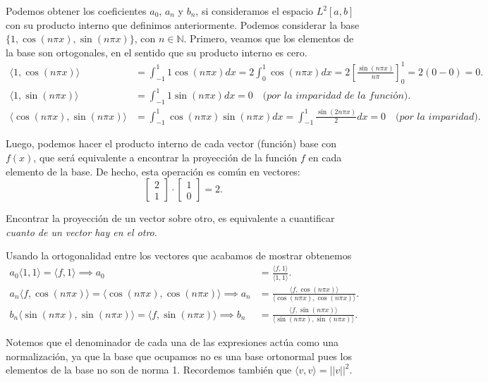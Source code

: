 \documentclass[12pt]{book}
\begin{document}
Podemos obtener los coeficientes $a_0$, $a_n$ y $b_n$, si consideramos el espacio $L^2[a,b]$ con su producto interno que definimos anteriormente. Podemos considerar la base $\{1,\cos(n\pi x), \sin(n\pi x)\}$, con $n\in \mathbb{N}$. Primero, veamos que los elementos de la base son ortogonales, en el sentido que su producto interno es cero.
\begin{align*}
    \langle 1,\cos(n\pi x)\rangle&=\int_{-1}^1 1\cos(n\pi x) dx=2\int_0^1 \cos(n\pi x)dx=2 \left[\frac{\sin(n\pi x)}{n\pi}\right]_0^1 =2(0-0)=0.\\
    \langle 1,\sin(n\pi x)\rangle&=\int_{-1}^1 1\sin(n\pi x) dx=0 \quad\textit{(por la imparidad de la función)}.\\
    \langle \cos(n\pi x),\sin(n\pi x)\rangle&=\int_{-1}^1 \cos(n\pi x)\sin(n\pi x) dx=\int_{-1}^1\frac{\sin(2n\pi x)}{2}dx=0\quad \textit{(por la imparidad)}.
\end{align*}

Luego, podemos hacer el producto interno de cada vector (función) base con $f(x)$, que será equivalente a encontrar la proyección de la función $f$ en cada elemento de la base. De hecho, esta operación es común en vectores:
    $$ \begin{bmatrix} 2 \\ 1 \end{bmatrix}\cdot \begin{bmatrix} 1 \\ 0 \end{bmatrix} = 2.$$

Encontrar la proyección de un vector sobre otro, es equivalente a cuantificar \textit{cuanto de un vector hay en el otro}.


Usando la ortogonalidad entre los vectores que acabamos de mostrar obtenemos
\begin{align*}
    a_0 \langle 1,1\rangle=\langle f, 1\rangle\implies a_0&=\frac{\langle f, 1\rangle}{\langle 1,1\rangle}.\\
    a_n\langle f, \cos(n\pi x)\rangle=\langle \cos(n\pi x), \cos(n\pi x)\rangle\implies a_n&= \frac{\langle f, \cos(n\pi x)\rangle}{\langle\cos(n\pi x),\cos(n\pi x)\rangle}.\\
    b_n\langle\sin(n\pi x),\sin(n\pi x)\rangle=\langle f, \sin(n\pi x)\rangle\implies b_n&= \frac{\langle f, \sin(n\pi x)\rangle}{\langle\sin(n\pi x),\sin(n\pi x)\rangle}.
\end{align*}

Notemos que el denominador de cada una de las expresiones actúa como una normalización, ya que la base que ocupamos no es una base ortonormal pues los elementos de la base no son de norma 1. Recordemos también que $\langle v,v\rangle=||v||^2$.\\
\end{document}
